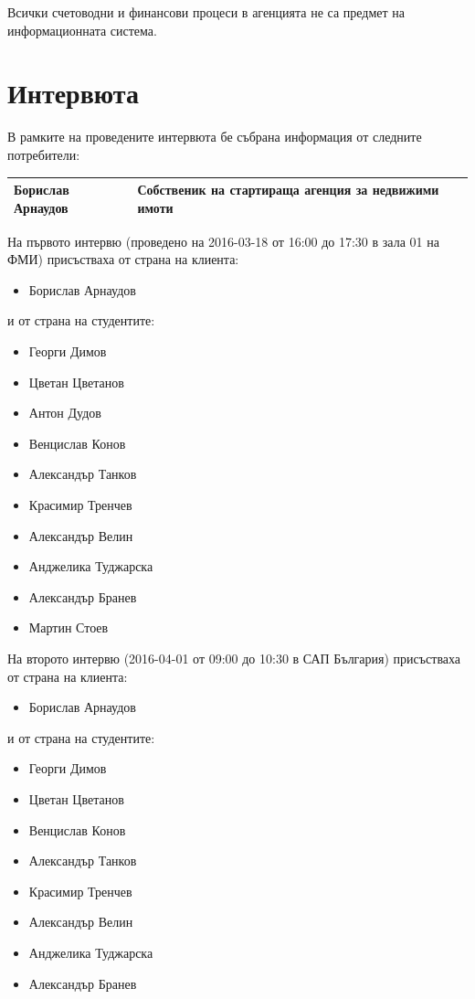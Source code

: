 \documentclass[]{article}
\begin{document}
Всички счетоводни и финансови процеси в агенцията не са предмет на информационната система.

\section{Интервюта}
В рамките на проведените интервюта бе събрана информация от следните потребители:

\begin{center}
\begin{tabular}{|l|l|}
\hline
Борислав Арнаудов & Собственик на стартираща агенция за недвижими имоти \\
\hline
\end{tabular}
\end{center}

На първото интервю (проведено на 2016-03-18 от 16:00 до 17:30 в зала 01 на ФМИ) присъстваха от страна на клиента:
\begin{itemize}
\item Борислав Арнаудов
\end{itemize}
и от страна на студентите:
\begin{itemize}
\item Георги Димов
\item Цветан Цветанов
\item Антон Дудов
\item Венцислав Конов
\item Александър Танков
\item Красимир Тренчев
\item Александър Велин
\item Анджелика Туджарска
\item Александър Бранев
\item Мартин Стоев
\end{itemize}

На второто интервю (2016-04-01 от 09:00 до 10:30 в САП България) присъстваха от страна на клиента:
\begin{itemize}
\item Борислав Арнаудов
\end{itemize}
и от страна на студентите:
\begin{itemize}
\item Георги Димов
\item Цветан Цветанов
\item Венцислав Конов
\item Александър Танков
\item Красимир Тренчев
\item Александър Велин
\item Анджелика Туджарска
\item Александър Бранев
\end{itemize}
\end{document}
